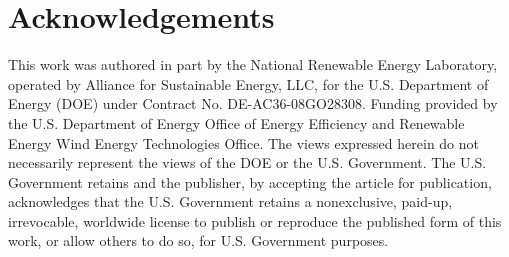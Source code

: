 \documentclass[%
 aip,
 amsmath,
 amssymb,
preprint,%
]{revtex4-2}
\begin{document}





\section*{Acknowledgements}

This work was authored in part by the National Renewable Energy Laboratory, operated by Alliance for Sustainable Energy, LLC, for the U.S. Department of Energy (DOE) under Contract No. DE-AC36-08GO28308. Funding provided by the U.S. Department of Energy Office of Energy Efficiency and Renewable Energy Wind Energy Technologies Office. The views expressed herein do not necessarily represent the views of the DOE or the U.S. Government. The U.S. Government retains and the publisher, by accepting the article for publication, acknowledges that the U.S. Government retains a nonexclusive, paid-up, irrevocable, worldwide license to publish or reproduce the published form of this work, or allow others to do so, for U.S. Government purposes. 



\end{document}
